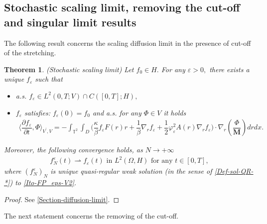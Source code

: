 \documentclass[a4paper,12pt, reqno]{amsart}
\newtheorem{theorem}{Theorem}
\renewcommand{\k}{\kappa}
\begin{document}
     \subsection{Stochastic scaling limit, removing the cut-off and singular limit results}
The following result concerns  the scaling diffusion limit in the presence of cut-off of the stretching.
      \begin{theorem}\label{THm-scal-eps}(Stochastic scaling limit)
   Let  $f_0\in H.$       For any $\varepsilon>0,$ there exists a unique $f_\varepsilon$ such that
    \begin{itemize}
        \item a.s.  $f_\varepsilon \in L^2(0, T;V) \cap C([0, T];H),$
        \item   $f_\varepsilon$ satisfies:  $f_\varepsilon(0)=f_0$ and a.s. for any $\Phi \in V$ it holds
        \begin{align}\label{limit-PDE-eps-finalV1}
    \langle\dfrac{\partial f_\varepsilon}{\partial t},\Phi\rangle_{V^\prime,V}=-\int_{\mathbb{T}^2}\int_D\big ( \dfrac{\k}{\beta} f_\varepsilon F(r)r+\dfrac{1}{\beta}\nabla_rf_\varepsilon+ \dfrac{1}{2}\varphi_\varepsilon^2 A(r) \nabla_rf_\varepsilon\big)\cdot \nabla_r\left(\dfrac{\Phi}{\mathbf{M}}\right) drdx.
\end{align}
    \end{itemize}
      Moreover, the following convergence holds, as $N\to +\infty$
    \begin{align}\label{cv-N-eps-timeV1}
        f^\varepsilon_N(t) \rightharpoonup f_\varepsilon(t) \text{ in } L^2(\Omega,H) \text{ for any } t\in [0,T],
    \end{align}
  where $(f^\varepsilon_N)_{N}$ is unique quasi-regular weak solution (in the sense of \autoref{Def-sol-QR-*}) to       \eqref{Ito-FP_eps-V2}.
    \end{theorem}
    \begin{proof}
        See \autoref{Section-diffusion-limit}.
    \end{proof}
The next statement concerns the removing of the cut-off.
\end{document}
